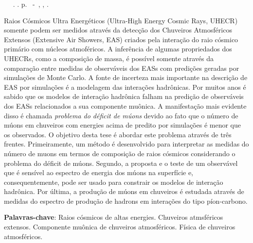 \setlength{\absparsep}{18pt} %
\begin{resumo}[Resumo]
	\begin{flushleft} 
		        \setlength{\absparsep}{0pt} %
			\SingleSpacing 
			\imprimirautorabr~ ~\textbf{\imprimirtitleabstract}. \imprimirdata. \pageref{LastPage}p. 
			\imprimirtipotrabalhopt~-~\imprimirinstituicao, \imprimirlocal, \imprimirdata. 
 	\end{flushleft}
        \OnehalfSpacing 			

Raios C\'osmicos Ultra Energ\'eticos (Ultra-High Energy Cosmic Rays, UHECR) somente
podem ser medidos atrav\'es da detec\c{c}\~ao dos Chuveiros Atmosf\'ericos Extensos
(Extensive Air Showers, EAS) criados pela intera\c{c}\~ao do raio c\'osmico prim\'ario com
n\'ucleos atmof\'ericos. A infer\^encia de algumas propriedados dos UHECRs, como a composi\c{c}\~ao
de massa, \'e poss\'ivel somente atrav\'es da compara\c{c}\~ao entre medidas de observ\'aveis dos EASs
com predi\c{c}\~oes geradas por simula\c{c}\~oes de Monte Carlo. A fonte de incerteza mais importante
na descri\c{c}\~ao de EAS por simula\c{c}\~oes \'e a modelagem das intera\c{c}\~oes hadr\^onicas. Por muitos
anos \'e sabido que os modelos de intera\c{c}\~ao hadr\^onica falham na predi\c{c}\~ao de observ\'aveis
dos EASs relacionados a sua componente mu\^onica. A manifesta\c{c}\~ao mais evidente disso \'e 
chamada \emph{problema do d\'eficit de m\'uons} devido ao fato que o n\'umero de m\'uons em chuveiros
com energies acima de  predito por simula\c{c}\~oes \'e menor que os observados.
O objetivo desta tese \'e abordar este problema atrav\'es de tr\^es frentes. Primeiramente,
um m\'etodo \'e desenvolvido para interpretar as medidas do n\'umero de muons em termos
de composi\c{c}\~ao de raios c\'osmicos considerando o problema do d\'eficit de m\'uons.
Segundo, a proposta e o teste de um observ\'avel que \'e sens\'ivel ao espectro de energia dos m\'uons
na superf\'icie e, consequentemente, pode ser usado para constrair os modelos de intera\c{c}\~ao hadr\^onica.
Por \'ultima, a produ\c{c}\~ao de m\'uons em chuveiros \'e estudada atrav\'es
de medidas do espectro de produ\c{c}\~ao de hadrons em intera\c{c}\~oes do tipo p\'ion-carbono.



 \textbf{Palavras-chave}: Raios c\'osmicos de altas energies. Chuveiros atmsf\'ericos extensos. Componente mu\^onica de chuveiros atmosf\'ericos. F\'isica de chuveiros atmosf\'ericos.   
\end{resumo}
